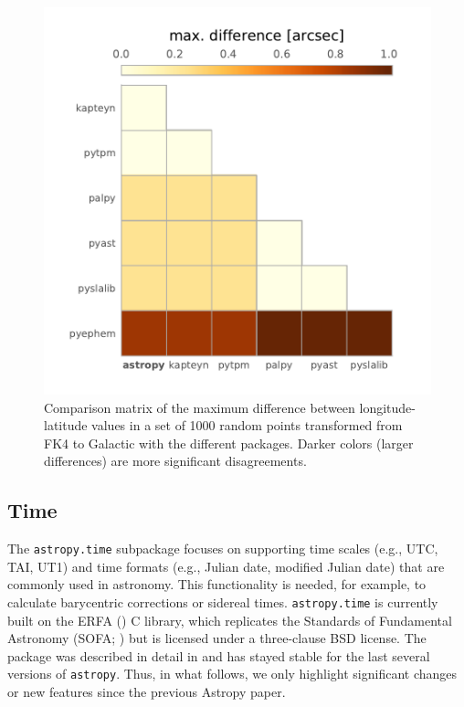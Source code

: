\documentclass[modern]{aastex61}
\newcommand{\package}[1]{\texttt{#1}\xspace}
\newcommand{\astropy}{Astropy\xspace}
\newcommand{\astropypkg}{\package{astropy}}
\begin{document}
\begin{figure}
  \includegraphics[width=\textwidth]{coordinates-benchmark.pdf}
  \caption{
    Comparison matrix of the maximum difference between longitude-latitude
    values in a set of 1000 random points transformed from FK4 to Galactic
    with the different packages.
    Darker colors (larger differences) are more significant disagreements.
    \label{fig:coordinate_benchmarks}
  }
\end{figure}

\subsection{Time}
\label{sec:time}

The \package{astropy.time} subpackage focuses on supporting time scales (e.g.,
UTC, TAI, UT1) and time formats (e.g., Julian date, modified Julian date) that
are commonly used in astronomy.
This functionality is needed, for example, to calculate barycentric corrections
or sidereal times.
\package{astropy.time} is currently built on the ERFA (\citealt{erfa}) C
library, which replicates the Standards of Fundamental Astronomy (SOFA;
\citealt{sofa}) but is licensed under a three-clause BSD license.
The package was described in detail in  \citet{astropy} and has
stayed stable for the last several versions of \astropypkg.
Thus, in what follows, we only highlight significant changes or new features
since the previous \astropy paper.
\end{document}
